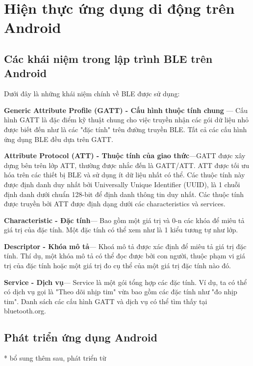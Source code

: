 \section{Hiện thực ứng dụng di động trên Android}

\subsection{Các khái niệm trong lập trình BLE trên Android}
Dưới đây là những khái niệm chính về BLE được sử dụng: \cite{deva}

\textbf{Generic Attribute Profile (GATT) -  Cấu hình thuộc tính chung }— Cấu hình GATT là đặc điểm kỹ thuật chung cho việc truyền nhận các gói dữ liệu nhỏ được biết đến như là các "đặc tính" trên đường truyền BLE. Tất cả các cấu hình ứng dụng BLE đều dựa trên GATT.

\textbf{Attribute Protocol (ATT) - Thuộc tính của giao thức}—GATT được xây dựng bên trên lớp ATT, thường được nhắc đến là GATT/ATT. ATT được tối ưu hóa trên các thiết bị BLE và sử dụng ít dữ liệu nhất có thể. Các thuộc tính này được định danh duy nhất bởi Universally Unique Identifier (UUID), là 1 chuỗi định danh dưới chuẩn 128-bit để định danh thông tin duy nhất. Các thuộc tính được truyền bởi ATT được định dạng dưới các characteristics và services.

\textbf{Characteristic -  Đặc tính}— Bao gồm một giá trị và 0-n các khóa để miêu tả giá trị của đặc tính. Một đặc tính có thể xem như là 1 kiểu tương tự như lớp.

\textbf{Descriptor - Khóa mô tả}— Khoá mô tả được xác định để miêu tả giá trị đặc tính. Thí dụ, một khóa mô tả có thể đọc được bởi con người, thuộc phạm vi giá trị của đặc tính hoặc một giá trị đo cụ thể của một giá trị đặc tính nào đó.

\textbf{Service - Dịch vụ}— Service là một gói tổng hợp các đặc tính. Ví dụ, ta có thể có dịch vụ gọi là "Theo dõi nhịp tim" vừa bao gồm các đặc tính như "đo nhịp tim". Danh sách các cấu hình GATT và dịch vụ có thể tìm thấy tại bluetooth.org.

\subsection{Phát triển ứng dụng Android}

* bổ sung thêm sau, phát triển từ \cite{blegatt}
